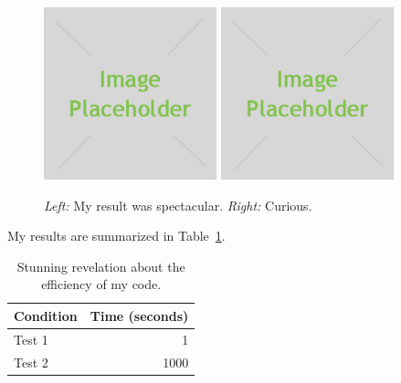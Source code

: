 \begin{figure}[h]
    \centering
    \includegraphics[width=5cm]{placeholder.jpg}
    \includegraphics[width=5cm]{placeholder.jpg}
    \caption{\emph{Left:} My result was spectacular. \emph{Right:} Curious.}
    \label{fig:result1}
\end{figure}



My results are summarized in Table~\ref{tab:table1}.

\begin{table}[h]
    \centering
    \begin{tabular}{lr}
        \toprule
        Condition & Time (seconds) \\
        \midrule
        Test 1 & 1 \\
        Test 2 & 1000 \\
        \bottomrule
    \end{tabular}
    \caption{Stunning revelation about the efficiency of my code.}
    \label{tab:table1}
\end{table}

